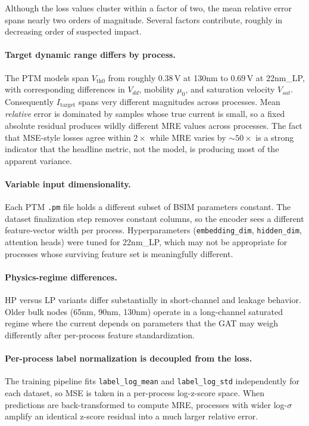 Although the loss values cluster within a factor of two, the mean relative
error spans nearly two orders of magnitude. Several factors contribute,
roughly in decreasing order of suspected impact.

\paragraph{Target dynamic range differs by process.}
The PTM models span $V_{\text{th0}}$ from roughly $0.38\,\text{V}$ at 130nm
to $0.69\,\text{V}$ at 22nm\_LP, with corresponding differences in $V_{dd}$,
mobility $\mu_0$, and saturation velocity $V_{sat}$. Consequently
$I_{\text{target}}$ spans very different magnitudes across processes. Mean
\emph{relative} error is dominated by samples whose true current is small,
so a fixed absolute residual produces wildly different MRE values across
processes. The fact that MSE-style losses agree within $2\times$ while MRE
varies by $\sim 50\times$ is a strong indicator that the headline metric, not
the model, is producing most of the apparent variance.

\paragraph{Variable input dimensionality.}
Each PTM \texttt{.pm} file holds a different subset of BSIM parameters
constant. The dataset finalization step removes constant columns, so the
encoder sees a different feature-vector width per process. Hyperparameters
(\texttt{embedding\_dim}, \texttt{hidden\_dim}, attention heads) were tuned
for 22nm\_LP, which may not be appropriate for processes whose surviving
feature set is meaningfully different.

\paragraph{Physics-regime differences.}
HP versus LP variants differ substantially in short-channel and leakage
behavior. Older bulk nodes (65nm, 90nm, 130nm) operate in a long-channel
saturated regime where the current depends on parameters that the GAT may
weigh differently after per-process feature standardization.

\paragraph{Per-process label normalization is decoupled from the loss.}
The training pipeline fits \texttt{label\_log\_mean} and
\texttt{label\_log\_std} independently for each dataset, so MSE is taken in
a per-process log-z-score space. When predictions are back-transformed to
compute MRE, processes with wider log-$\sigma$ amplify an identical
z-score residual into a much larger relative error.

